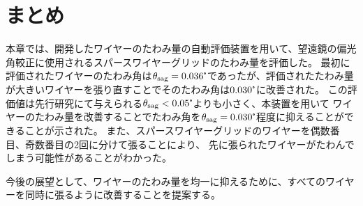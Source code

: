 \documentclass[../../main.tex]{subfiles}
\begin{document}
\section{まとめ}
本章では、開発したワイヤーのたわみ量の自動評価装置を用いて、望遠鏡の偏光角較正に使用されるスパースワイヤーグリッドのたわみ量を評価した。
最初に評価されたワイヤーのたわみ角は$\theta_{\mathrm{sag}}=0.036\tcdegree$であったが、評価されたたわみ量が大きいワイヤーを張り直すことでそのたわみ角は$0.030\tcdegree$に改善された。
この評価値は先行研究にて与えられる$\theta_{\mathrm{sag}}<0.05\tcdegree$よりも小さく、本装置を用いて
ワイヤーのたわみ量を改善することでたわみ角を$\theta_{\mathrm{sag}}=0.030\tcdegree$程度に抑えることができることが示された。
また、スパースワイヤーグリッドのワイヤーを偶数番目、奇数番目の2回に分けて張ることにより、
先に張られたワイヤーがたわんでしまう可能性があることがわかった。

今後の展望として、ワイヤーのたわみ量を均一に抑えるために、すべてのワイヤーを同時に張るように改善することを提案する。

\end{document}
